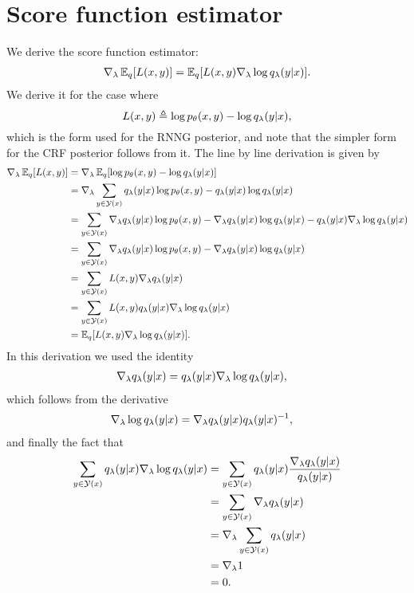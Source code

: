 \section{Score function estimator}
  We derive the score function estimator:
  \begin{align}
    \label{eq:score-function-estimator}
    \nabla_{\lambda} \operatorname{\mathbb{E}}_{q} [ L(x, y) ] = \operatorname{\mathbb{E}}_{q} [ L(x, y) \nabla_{\lambda} \log q_{\lambda}(y | x) ].
  \end{align}
  We derive it for the case where
  \begin{equation*}
    L(x, y) \triangleq \log p_{\theta}(x, y) - \log q_{\lambda}(y | x),
  \end{equation*}
  which is the form used for the RNNG posterior, and note that the simpler form for the CRF posterior follows from it. The line by line derivation is given by
  \begin{align*}
    \nabla_{\lambda} \operatorname{\mathbb{E}}_{q} [ L(x, y) ] &=
    \nabla_{\lambda} \operatorname{\mathbb{E}}_{q} [ \log p_{\theta}(x, y) - \log q_{\lambda}(y | x) ] \\
      &= \nabla_{\lambda} \sum_{y \in \mathcal{Y}(x)} q_{\lambda}(y | x) \log p_{\theta}(x, y) - q_{\lambda}(y | x)\log q_{\lambda}(y | x) \\
      &= \sum_{y \in \mathcal{Y}(x)} \nabla_{\lambda} q_{\lambda}(y | x) \log p_{\theta}(x, y)  - \nabla_{\lambda} q_{\lambda}(y | x)\log q_{\lambda}(y | x) -  q_{\lambda}(y | x)\nabla_{\lambda}\log q_{\lambda}(y | x) \\
      &= \sum_{y \in \mathcal{Y}(x)} \nabla_{\lambda} q_{\lambda}(y | x) \log p_{\theta}(x, y) - \nabla_{\lambda} q_{\lambda}(y | x)\log q_{\lambda}(y | x) \\
      &= \sum_{y \in \mathcal{Y}(x)} L(x, y)\nabla_{\lambda} q_{\lambda}(y | x) \\
      &= \sum_{y \in \mathcal{Y}(x)} L(x, y) q_{\lambda}(y | x) \nabla_{\lambda} \log q_{\lambda}(y | x)   \\
      &= \operatorname{\mathbb{E}}_{q} [ L(x, y) \nabla_{\lambda} \log q_{\lambda}(y | x) ].
  \end{align*}
  In this derivation we used the identity
  \begin{align*}
    \nabla_{\lambda} q_{\lambda}(y | x) &= q_{\lambda}(y | x)\nabla_{\lambda}\log q_{\lambda}(y | x),
  \end{align*}
  which follows from the derivative
  \begin{align*}
    \nabla_{\lambda}\log q_{\lambda}(y | x) &= \nabla_{\lambda} q_{\lambda}(y | x)q_{\lambda}(y | x)^{-1},
  \end{align*}
  and finally the fact that
  \begin{align*}
    \sum_{y \in \mathcal{Y}(x)} q_{\lambda}(y | x)\nabla_{\lambda}\log q_{\lambda}(y | x)
      &= \sum_{y \in \mathcal{Y}(x)}  q_{\lambda}(y | x) \frac{\nabla_{\lambda} q_{\lambda}(y | x)}{q_{\lambda}(y | x)}  \\
      &= \sum_{y \in \mathcal{Y}(x)} \nabla_{\lambda} q_{\lambda}(y | x) \\
      &= \nabla_{\lambda} \sum_{y \in \mathcal{Y}(x)} q_{\lambda}(y | x)\\
      &= \nabla_{\lambda} 1 \\
      &= 0. \\
  \end{align*}

